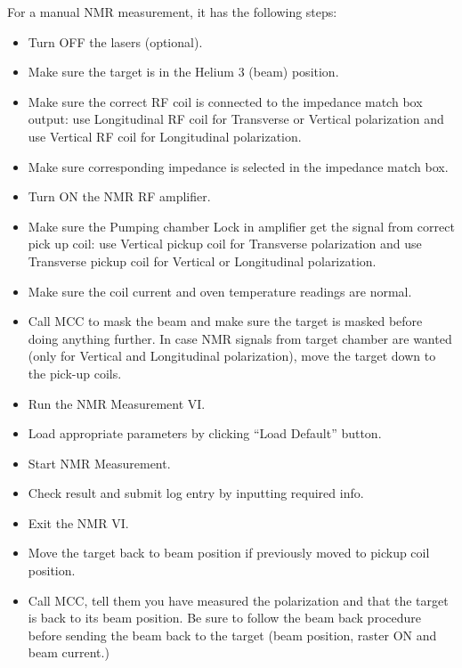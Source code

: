 {For a manual NMR measurement, it has the following steps:
\begin{itemize}
\item Turn OFF the lasers (optional).
\item Make sure the target is in the Helium 3 (beam) position.
\item Make sure the correct RF coil is connected to the
  impedance match box output: use Longitudinal RF coil for
  Transverse or Vertical polarization and use Vertical RF coil for
  Longitudinal polarization.
\item Make sure corresponding impedance is selected in the impedance
  match box.
\item Turn ON the NMR RF amplifier.
\item Make sure the Pumping chamber Lock in amplifier get the signal
  from correct pick up coil: use Vertical pickup coil for Transverse
  polarization and use Transverse pickup coil for Vertical or 
  Longitudinal polarization.
\item Make sure the coil current and oven temperature readings are normal.
\item Call MCC to mask the beam and make sure the target is masked
  before doing anything further. 
  In case NMR signals from target chamber are wanted (only for
  Vertical and Longitudinal polarization), move the target down to the 
  pick-up coils.
\item Run the NMR Measurement VI.
\item Load appropriate parameters by clicking ``Load Default'' button.
\item Start NMR Measurement.
\item Check result and submit log entry by inputting required info.
\item Exit the NMR VI.
\item Move the target back to beam position if previously moved to
  pickup coil position.
\item Call MCC, tell them you have measured the polarization and that 
  the target is back to its beam position. 
  Be sure to follow the beam back procedure before sending the beam
  back to the target (beam position, raster ON and beam current.)
\end{itemize}


}
